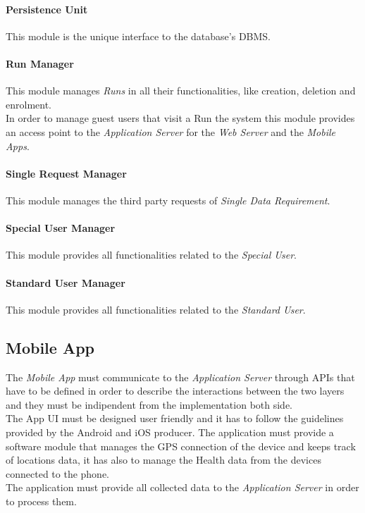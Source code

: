 \paragraph{Persistence Unit}
This module is the unique interface to the database's DBMS.

\paragraph{Run Manager}
This module manages \textit{Runs} in all their functionalities, like creation, deletion and enrolment.\\
In order to manage guest users that visit a Run the system this module provides an access point to the \textit{Application Server} for the \textit{Web Server} and the \textit{Mobile Apps}.

\paragraph{Single Request Manager}
This module manages the third party requests of \textit{Single Data Requirement}.

\paragraph{Special User Manager}
This module provides all functionalities related to the \textit{Special User}.

\paragraph{Standard User Manager}
This module provides all functionalities related to the \textit{Standard User}.


\subsection{Mobile App}
The \textit{Mobile App} must communicate to the \textit{Application Server} through APIs that have to be defined in order to describe the interactions between the two layers and they must be indipendent from the implementation both side.\\
The App UI must be designed user friendly and it has to follow the guidelines provided by the Android and iOS producer.
The application must provide a software module that manages the GPS connection of the device and keeps track of locations data, it has also to manage the Health data from the devices connected to the phone.\\
The application must provide all collected data to the \textit{Application Server} in order to process them.

